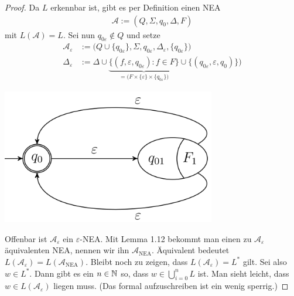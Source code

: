 \documentclass[12pt,a4paper]{article}
\newcommand{\A}{\mathcal{A}}
\begin{document}
\begin{proof}
	Da $L$ erkennbar ist, gibt es per Definition einen NEA
	\begin{align*}
		\A:=(Q,\Sigma,q_0,\Delta,F)
	\end{align*}
	mit $L(\A)=L$. 
	Sei nun $q_{0\varepsilon}\not\in Q$ und setze
	\begin{align*}
		\A_\varepsilon&:=\Big(Q\cup\lbrace q_{0\varepsilon}\rbrace,\Sigma,q_{0\varepsilon},\Delta_\varepsilon,\lbrace q_{0\varepsilon}\rbrace\Big)\\
		\Delta_\varepsilon&:=\Delta\cup\underbrace{\big\lbrace(f,\varepsilon,q_{0\varepsilon}):f\in F\big\rbrace}_{
			=\big(F\times\lbrace\varepsilon\rbrace\times\lbrace q_{0\varepsilon}\rbrace\big)
		}\cup\big\lbrace(q_{0\varepsilon},\varepsilon,q_{0})\big\rbrace\Big)
	\end{align*}
	
	
  \includegraphics[width=0.7\textwidth]{Blatt10_4.png}
  
  Offenbar ist $\A_\varepsilon$ ein $\varepsilon$-NEA. Mit Lemma 1.12 bekommt man einen zu $\A_\varepsilon$ äquivalenten NEA, nennen wir ihn $\A_{\text{NEA}}$. Äquivalent bedeutet $L(\A_\varepsilon)=L(\A_{\text{NEA}})$.\nl
  Bleibt noch zu zeigen, dass $L(\A_\varepsilon)=L^\ast$ gilt. 
  Sei also $w\in L^\ast$.
  Dann gibt es ein $n\in\mathbb{N}$ so, dass $w\in\bigcup\limits_{i=0}^n L$ ist. Man sieht leicht, dass $w\in L(\A_\varepsilon)$ liegen muss. (Das formal aufzuschreiben ist ein wenig sperrig.)
\end{proof}
\end{document}

